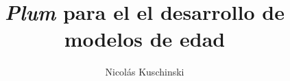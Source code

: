 \documentclass{beamer}
\title{\textit{Plum} para el el desarrollo de modelos de edad }
\author{Nicolás Kuschinski}
\date{}
\newcommand {\1}{1{\hskip -2.5 pt}\hbox{I}}
\begin{document}
    \begin{frame}
    \maketitle
    \end{frame}
\end{document}
